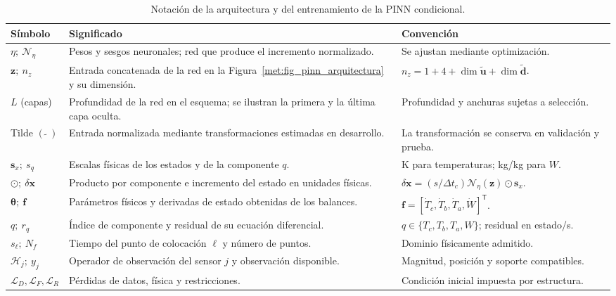 \begin{table}[p]
\centering
\caption{Notación de la arquitectura y del entrenamiento de la PINN condicional.}
\label{met:tabla_pinn_notacion}
\begingroup
\small
\setlength{\tabcolsep}{4pt}
\renewcommand{\arraystretch}{1.12}
\begin{tabularx}{\textwidth}{@{}>{\raggedright\arraybackslash}p{}>{\raggedright\arraybackslash}X>{\raggedright\arraybackslash}p{}@{}}
\toprule
Símbolo & Significado & Convención \\
\midrule
$\eta;\ \mathcal N_\eta$ & Pesos y sesgos neuronales; red que produce el incremento normalizado. & Se ajustan mediante optimización. \\
$\mathbf z;\ n_z$ & Entrada concatenada de la red en la Figura~\ref{met:fig_pinn_arquitectura} y su dimensión. & $n_z=1+4+\dim\widetilde{\mathbf u}+\dim\widetilde{\mathbf d}$. \\
$L$ (capas) & Profundidad de la red en el esquema; se ilustran la primera y la última capa oculta. & Profundidad y anchuras sujetas a selección. \\
Tilde $(\widetilde{\ \ })$ & Entrada normalizada mediante transformaciones estimadas en desarrollo. & La transformación se conserva en validación y prueba. \\
$\mathbf s_x;\ s_q$ & Escalas físicas de los estados y de la componente $q$. & K para temperaturas; kg/kg para $W$. \\
$\odot;\ \delta\mathbf x$ & Producto por componente e incremento del estado en unidades físicas. & $\delta\mathbf x=(s/\Delta t_c)\mathcal N_\eta(\mathbf z)\odot\mathbf s_x$. \\
$\boldsymbol\theta;\ \mathbf f$ & Parámetros físicos y derivadas de estado obtenidas de los balances. & $\mathbf f=[\dot T_c,\dot T_b,\dot T_a,\dot W]^{\mathsf T}$. \\
$q;\ r_q$ & Índice de componente y residual de su ecuación diferencial. & $q\in\{T_c,T_b,T_a,W\}$; residual en estado/s. \\
$s_\ell;\ N_f$ & Tiempo del punto de colocación $\ell$ y número de puntos. & Dominio físicamente admitido. \\
$\mathcal H_j;\ y_j$ & Operador de observación del sensor $j$ y observación disponible. & Magnitud, posición y soporte compatibles. \\
$\mathcal L_D,\mathcal L_F,\mathcal L_R$ & Pérdidas de datos, física y restricciones. & Condición inicial impuesta por estructura. \\

\end{tabularx}
\end{table}
